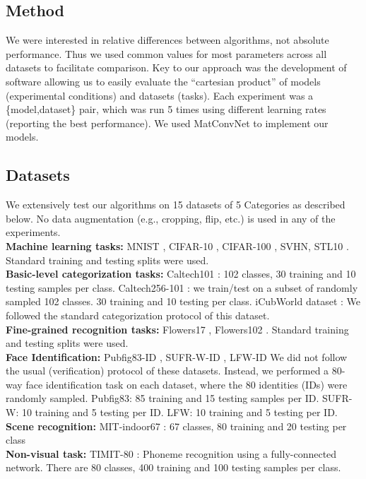 \documentclass[letterpaper]{article}
\begin{document}
\subsection{Method}
We were interested in relative differences between algorithms, not absolute performance. Thus we used common values for most parameters across all datasets to facilitate comparison. Key to our approach was the development of software allowing us to easily evaluate the ``cartesian product'' of models (experimental conditions) and datasets (tasks). Each experiment was a \{model,dataset\} pair, which was run 5 times using different learning rates (reporting the best performance). We used MatConvNet \cite{vedaldi15matconvnet} to implement our models.


\subsection{Datasets}
We extensively test our algorithms on 15 datasets of 5 Categories as described below. No data augmentation (e.g., cropping, flip, etc.) is used in any of the experiments. \\
\textbf{Machine learning tasks:} MNIST \cite{mnistWebsite}, CIFAR-10 \cite{krizhevsky2009learning}, CIFAR-100 \cite{krizhevsky2009learning}, SVHN\cite{netzer2011reading}, STL10 \cite{coates2011analysis}. Standard training and testing splits were used. \\
\textbf{Basic-level categorization tasks:} Caltech101 \cite{fei2007learning}: 102 classes, 30 training and 10 testing samples per class. Caltech256-101 \cite{griffin2007caltech}: we train/test on a subset of randomly sampled 102 classes. 30 training and 10 testing per class. iCubWorld dataset \cite{fanello2013icub}: We followed the standard categorization protocol of this dataset.\\
\textbf{Fine-grained recognition tasks:} Flowers17 \cite{nilsback2006visual}, Flowers102 \cite{nilsback2008automated}. Standard training and testing splits were used.  \\
\textbf{Face Identification:} Pubfig83-ID \cite{pinto2011scaling},  SUFR-W-ID \cite{leibo2014subtasks}, LFW-ID \cite{Huang2008} We did not follow the usual (verification) protocol of these datasets. Instead, we performed a 80-way face identification task on each dataset, where the 80 identities (IDs) were randomly sampled. Pubfig83: 85 training and 15 testing samples per ID.  SUFR-W: 10 training and 5 testing per ID. LFW: 10 training and 5 testing per ID. \\
\textbf{Scene recognition:} MIT-indoor67 \cite{quattoni2009recognizing}:  67 classes, 80 training and 20 testing per class \\
\textbf{Non-visual task:} TIMIT-80 \cite{TIMITdatabase}: Phoneme recognition using a fully-connected network. There are 80 classes, 400 training and 100 testing samples per class.
\end{document}

